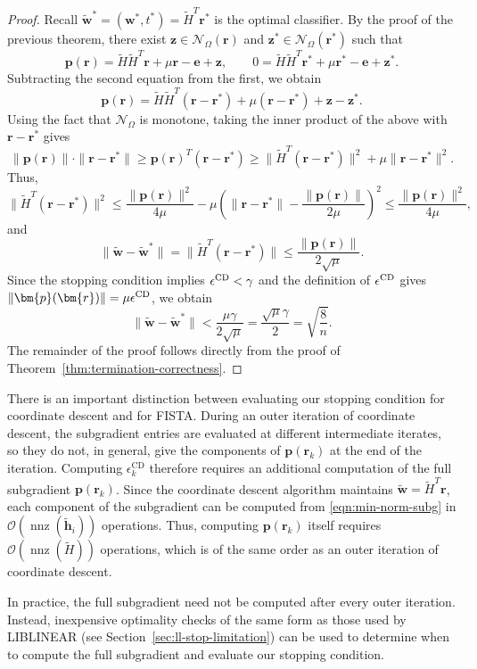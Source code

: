 \documentclass[twoside,11pt]{article}
\newcommand\p{\bm{p}}
\renewcommand\r{\bm{r}}
\newcommand\w{\bm{w}}
\newcommand\z{\bm{z}}
\newcommand{\nnz}{\mathop{\mathrm{nnz}}}
\newcommand\e{\bm{e}}
\newcommand\mN{\mathcal{N}}
\renewcommand\O{\mathcal{O}}
\newcommand\tw{\tilde{\w}}
\newcommand\h{\bm{h}}
\newcommand\tth{\tilde{\h}}
\newcommand\tH{\tilde{H}}
\begin{document}
    \begin{proof}
        Recall $\tw^* = (\w^*, t^*) = \tH^T\r^*$ is the optimal classifier. By the proof of the previous theorem, there exist $\z \in \mN_{\Omega}(\r)$ and $\z^* \in \mN_{\Omega}(\r^*)$ such that
        \[
            \p(\r) = \tH\tH^T\r + \mu\r - \e + \z,\qquad 0 = \tH\tH^T\r^* + \mu\r^* - \e + \z^*.
        \]
        Subtracting the second equation from the first, we obtain
        \[
            \p(\r) = \tH\tH^T(\r - \r^*) + \mu(\r - \r^*) + \z - \z^*.
        \]
        Using the fact that $\mN_{\Omega}$ is monotone, taking the inner product of the above with $\r - \r^*$ gives
        \[
            \|\p(\r)\|\cdot\|\r - \r^*\| \geq \p(\r)^T(\r - \r^*) \geq \|\tH^T(\r - \r^*)\|^2 + \mu\|\r - \r^*\|^2.
        \]
        Thus,
        \[
            \|\tH^T(\r - \r^*)\|^2 \leq \frac{\|\p(\r)\|^2}{4\mu} - \mu\left(\|\r - \r^*\| - \frac{\|\p(\r)\|}{2\mu}\right)^2 \leq \frac{\|\p(\r)\|^2}{4\mu},
        \]
        and
        \[
            \|\tw - \tw^*\| = \|\tH^T(\r - \r^*)\| \leq \frac{\|\p(\r)\|}{2\sqrt{\mu}}.
        \]
        Since the stopping condition implies $\epsilon^{\rm CD} < \gamma$ and the definition of $\epsilon^{\rm CD}$ gives $\|\p(\r)\| = \mu\epsilon^{\rm CD}$, we obtain
        \[
            \|\tw - \tw^*\| < \frac{\mu\gamma}{2\sqrt{\mu}} = \frac{\sqrt{\mu}\gamma}{2} = \sqrt{\frac{8}{n}}.
        \]
        The remainder of the proof follows directly from the proof of Theorem~\ref{thm:termination-correctness}.
    \end{proof}
    There is an important distinction between evaluating our stopping condition for coordinate descent and for FISTA. During an outer iteration of coordinate descent, the subgradient entries are evaluated at different intermediate iterates, so they do not, in general, give the components of $\p(\r_k)$ at the end of the iteration. Computing $\epsilon_k^{\mathrm{CD}}$ therefore requires an additional computation of the full subgradient $\p(\r_k)$. Since the coordinate descent algorithm maintains $\tw = \tH^T\r$, each component of the subgradient can be computed from \eqref{eqn:min-norm-subg} in $\O(\nnz(\tth_i))$ operations. Thus, computing $\p(\r_k)$ itself requires $\O(\nnz(\tH))$ operations, which is of the same order as an outer iteration of coordinate descent.

    In practice, the full subgradient need not be computed after every outer iteration. Instead, inexpensive optimality checks of the same form as those used by LIBLINEAR (see Section~\ref{sec:ll-stop-limitation}) can be used to determine when to compute the full subgradient and evaluate our stopping condition.
    
\end{document}
